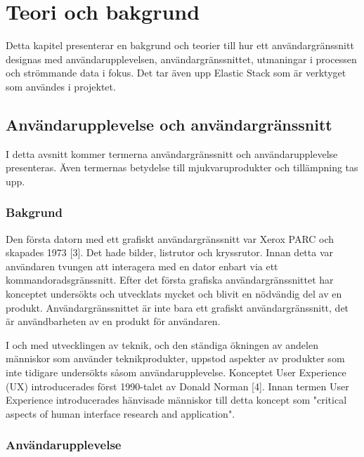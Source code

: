 \documentclass[12pt]{kththesis}
\begin{document}
\afterpage{\null\newpage}

\chapter{Teori och bakgrund}

Detta kapitel presenterar en bakgrund och teorier till hur ett användargränssnitt designas med användarupplevelsen, användargränssnittet, utmaningar i processen och strömmande data i fokus. Det tar även upp Elastic Stack som är verktyget som användes i projektet.

\section{Användarupplevelse och användargränssnitt} 
I detta avsnitt kommer termerna användargränssnitt och användarupplevelse presenteras. Även termernas betydelse till mjukvaruprodukter och tillämpning tas upp.

\subsection{Bakgrund} 

Den första datorn med ett grafiskt användargränssnitt var Xerox PARC och skapades 1973 [3]. Det hade bilder, listrutor och kryssrutor. Innan detta var användaren tvungen att interagera med en dator enbart via ett kommandoradsgränssnitt. Efter det första grafiska användargränssnittet har konceptet undersökts och utvecklats mycket och blivit en nödvändig del av en produkt. Användargränssnittet är inte bara ett grafiskt användargränssnitt, det är användbarheten av en produkt för användaren.

I och med utvecklingen av teknik, och den ständiga ökningen av andelen människor som använder teknikprodukter, uppstod aspekter av produkter som inte tidigare undersökts såsom användarupplevelse. Konceptet User Experience (UX) introducerades först 1990-talet av Donald Norman [4]. Innan termen User Experience introducerades hänvisade människor till detta koncept som "critical aspects of human interface research and application".

\subsection{Användarupplevelse}
 
\end{document}
